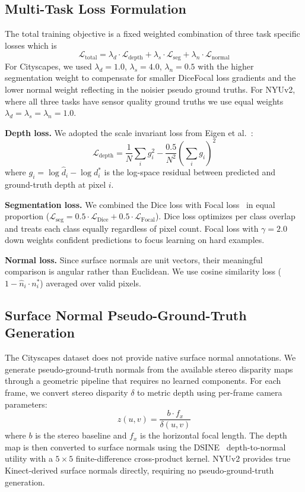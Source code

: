 \documentclass[journal, onecolumn]{IEEEtran}
\begin{document}
\subsection{Multi-Task Loss Formulation}

The total training objective is a fixed weighted combination of three task specific losses which is
\begin{equation}
\mathcal{L}_{\text{total}} = \lambda_d \cdot \mathcal{L}_{\text{depth}} + \lambda_s \cdot \mathcal{L}_{\text{seg}} + \lambda_n \cdot \mathcal{L}_{\text{normal}}
\end{equation}
For Cityscapes, we used $\lambda_d = 1.0$, $\lambda_s = 4.0$, $\lambda_n = 0.5$ with the higher segmentation weight to compensate for smaller DiceFocal loss gradients and the lower normal weight reflecting in the noisier pseudo ground truths. For NYUv2, where all three tasks have sensor quality ground truths we use equal weights $\lambda_d = \lambda_s = \lambda_n = 1.0$.

\textbf{Depth loss.} We adopted the scale invariant loss from Eigen et al.~\cite{eigen2014depth}:
\begin{equation}
\mathcal{L}_{\text{depth}} = \frac{1}{N}\sum_i g_i^2 - \frac{0.5}{N^2}\left(\sum_i g_i\right)^2
\end{equation}
where $g_i = \log \hat{d}_i - \log d_i^{*}$ is the log-space residual between predicted and ground-truth depth at pixel $i$.

\textbf{Segmentation loss.} We combined the Dice loss with Focal loss~\cite{lin2017focal} in equal proportion ($\mathcal{L}_{\text{seg}} = 0.5 \cdot \mathcal{L}_{\text{Dice}} + 0.5 \cdot \mathcal{L}_{\text{Focal}}$). Dice loss optimizes per class overlap and treats each class equally regardless of pixel count. Focal loss with $\gamma = 2.0$ down weights confident predictions to focus learning on hard examples.

\textbf{Normal loss.} Since surface normals are unit vectors, their meaningful comparison is angular rather than Euclidean. We use cosine similarity loss ($1 - \hat{n}_i \cdot n_i^{*}$) averaged over valid pixels.

\subsection{Surface Normal Pseudo-Ground-Truth Generation}

The Cityscapes dataset does not provide native surface normal annotations. We generate pseudo-ground-truth normals from the available stereo disparity maps through a geometric pipeline that requires no learned components. For each frame, we convert stereo disparity $\delta$ to metric depth using per-frame camera parameters:
\begin{equation}
z(u,v) = \frac{b \cdot f_x}{\delta(u,v)}
\end{equation}
where $b$ is the stereo baseline and $f_x$ is the horizontal focal length. The depth map is then converted to surface normals using the DSINE~\cite{bae2024dsine} depth-to-normal utility with a $5 \times 5$ finite-difference cross-product kernel. NYUv2 provides true Kinect-derived surface normals directly, requiring no pseudo-ground-truth generation.
\end{document}
